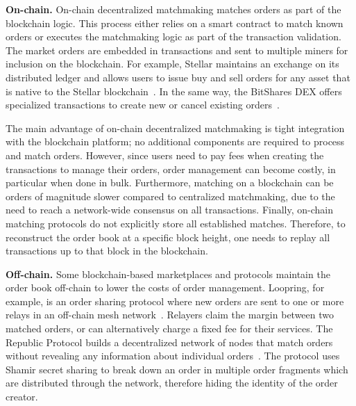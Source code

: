 \textbf{On-chain.}
On-chain decentralized matchmaking matches orders as part of the blockchain logic.
This process either relies on a smart contract to match known orders or executes the matchmaking logic as part of the transaction validation.
The market orders are embedded in transactions and sent to multiple miners for inclusion on the blockchain.
For example, Stellar maintains an exchange on its distributed ledger and allows users to issue buy and sell orders for any asset that is native to the Stellar blockchain~\cite{lokhava2019fast}.
In the same way, the BitShares DEX offers specialized transactions to create new or cancel existing orders~\cite{schuh2015bitshares}.

The main advantage of on-chain decentralized matchmaking is tight integration with the blockchain platform; no additional components are required to process and match orders.
However, since users need to pay fees when creating the transactions to manage their orders, order management can become costly, in particular when done in bulk.
Furthermore, matching on a blockchain can be orders of magnitude slower compared to centralized matchmaking, due to the need to reach a network-wide consensus on all transactions.
Finally, on-chain matching protocols do not explicitly store all established matches.
Therefore, to reconstruct the order book at a specific block height, one needs to replay all transactions up to that block in the blockchain.

\textbf{Off-chain.}
Some blockchain-based marketplaces and protocols maintain the order book off-chain to lower the costs of order management.
Loopring, for example, is an order sharing protocol where new orders are sent to one or more relays in an off-chain mesh network~\cite{loopring}.
Relayers claim the margin between two matched orders, or can alternatively charge a fixed fee for their services.
The Republic Protocol builds a decentralized network of nodes that match orders without revealing any information about individual orders~\cite{zhang2017republic}.
The protocol uses Shamir secret sharing to break down an order in multiple order fragments which are distributed through the network, therefore hiding the identity of the order creator.

